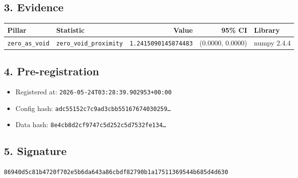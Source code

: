 \documentclass{article}
\begin{document}
\subsection*{3. Evidence}
\begin{tabular}{llrrl}\toprule
\textbf{Pillar} & \textbf{Statistic} & \textbf{Value} & \textbf{95\% CI} & \textbf{Library} \\\midrule
\texttt{zero\_as\_void} & \texttt{zero\_void\_proximity} & \texttt{1.2415090145874483} & (0.0000, 0.0000) & numpy 2.4.4 \\
\bottomrule\end{tabular}
\subsection*{4. Pre-registration}
\begin{itemize}
\item Registered at: \texttt{2026-05-24T03:28:39.902953+00:00}
\item Config hash: \texttt{adc55152c7c9ad3cbb55167674030259\dots}
\item Data hash: \texttt{8e4cb8d2cf9747c5d252c5d7532fe134\dots}
\end{itemize}
\subsection*{5. Signature}
\texttt{86940d5c81b4720f702e5b6da643a86cbdf82790b1a17511369544b685d4d630}\\
\end{document}
